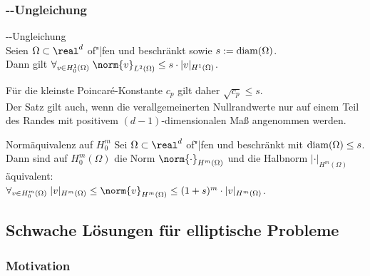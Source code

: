 \subsubsection{%
    --Ungleichung%
}

\begin{Satz}{--Ungleichung}\\
    Seien $\Omega \subset \real^d$ of"|fen und beschränkt sowie $s := \operatorname{diam}(\Omega)$.\\
    Dann gilt $\forall_{v \in H^1_0(\Omega)}\;
    \norm{v}_{L^2(\Omega)} \le s \cdot |v|_{H^1(\Omega)}$.
\end{Satz}

\begin{Bem}
    Für die kleinste Poincaré-Konstante $c_p$ gilt daher $\sqrt{c_p} \le s$.\\
    Der Satz gilt auch, wenn die verallgemeinerten Nullrandwerte nur auf einem Teil des
    Randes mit positivem $(d-1)$-dimensionalen Maß angenommen werden.
\end{Bem}

\begin{Satz}{Normäquivalenz auf $H^m_0$}
    Sei $\Omega \subset \real^d$ of"|fen und beschränkt mit $\operatorname{diam}(\Omega) \le s$.\\
    Dann sind auf $H_0^m(\Omega)$ die Norm $\norm{\cdot}_{H^m(\Omega)}$ und die Halbnorm
    $|\cdot|_{H^m(\Omega)}$ äquivalent:\\
    $\forall_{v \in H^m_0(\Omega)}\;
    |v|_{H^m(\Omega)} \le \norm{v}_{H^m(\Omega)} \le (1 + s)^m \cdot |v|_{H^m(\Omega)}$.
\end{Satz}

\pagebreak

\subsection{%
    Schwache Lösungen für elliptische Probleme%
}

\subsubsection{%
    Motivation%
}

